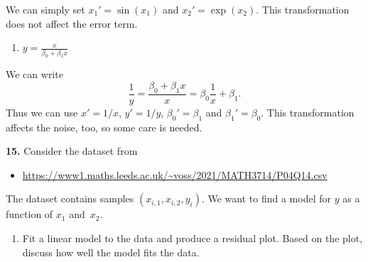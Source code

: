 \documentclass[
  a4paper,
]{article}
\providecommand{\tightlist}{%
  \setlength{\itemsep}{0pt}\setlength{\parskip}{0pt}}
\theoremstyle{definition}
\theoremstyle{definition}
\theoremstyle{definition}
\theoremstyle{definition}
\theoremstyle{remark}
\begin{document}
\begin{myanswers}
We can simply set \(x_1' = \sin(x_1)\) and \(x_2' = \exp(x_2)\).
This transformation does not affect the error term.

\end{myanswers}

\begin{enumerate}
\def\labelenumi{\alph{enumi}.}
\setcounter{enumi}{2}
\tightlist
\item
  \(y = \frac{x}{\beta_0 + \beta_1 x}\)
\end{enumerate}

\begin{myanswers}
We can write
\begin{equation*}
  \frac1y
  = \frac{\beta_0 + \beta_1 x}{x}
  = \beta_0 \frac1x + \beta_1.
\end{equation*}
Thus we can use \(x' = 1/x\), \(y' = 1/y\), \(\beta_0' = \beta_1\) and
\(\beta_1' = \beta_0\). This transformation affects the noise, too,
so some care is needed.

\end{myanswers}

\textbf{15.} Consider the dataset from

\begin{itemize}
\tightlist
\item
  \url{https://www1.maths.leeds.ac.uk/~voss/2021/MATH3714/P04Q14.csv}
\end{itemize}

The dataset contains samples \((x_{i,1}, x_{i,2}, y_i)\). We want to
find a model for \(y\) as a function of \(x_1\) and~\(x_2\).

\begin{enumerate}
\def\labelenumi{\alph{enumi}.}
\tightlist
\item
  Fit a linear model to the data and produce a residual plot.
  Based on the plot, discuss how well the model fits the data.
\end{enumerate}
\end{document}
